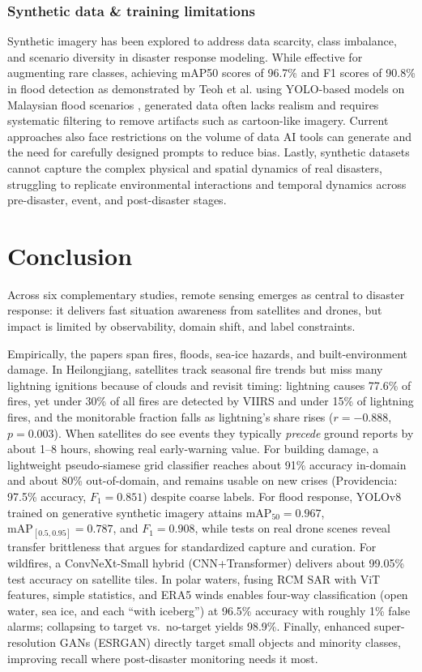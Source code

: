 \documentclass[conference,a4paper]{IEEEtran}
\begin{document}
\subsubsection{\textbf{Synthetic data \& training limitations}}
Synthetic imagery has been explored to address data scarcity, class imbalance, and scenario diversity in disaster response modeling. While effective for augmenting rare classes, achieving mAP50 scores of 96.7\% and F1 scores of 90.8\% in flood detection as demonstrated by Teoh et al. using YOLO-based models on Malaysian flood scenarios \cite{teohExploringGenerativeAI2024}, generated data often lacks realism and requires systematic filtering to remove artifacts such as cartoon-like imagery. Current approaches also face restrictions on the volume of data AI tools can generate and the need for carefully designed prompts to reduce bias. Lastly, synthetic datasets cannot capture the complex physical and spatial dynamics of real disasters, struggling to replicate environmental interactions and temporal dynamics across pre-disaster, event, and post-disaster stages.

\section{Conclusion}
Across six complementary studies, remote sensing emerges as central to disaster response: it delivers fast situation awareness from satellites and drones, but impact is limited by observability, domain shift, and label constraints.

Empirically, the papers span fires, floods, sea-ice hazards, and built-environment damage. In Heilongjiang, satellites track seasonal fire trends but miss many lightning ignitions because of clouds and revisit timing: lightning causes 77.6\% of fires, yet under 30\% of all fires are detected by VIIRS and under 15\% of lightning fires, and the monitorable fraction falls as lightning’s share rises ($r=-0.888$, $p=0.003$). When satellites do see events they typically \emph{precede} ground reports by about 1--8 hours, showing real early-warning value. For building damage, a lightweight pseudo-siamese grid classifier reaches about 91\% accuracy in-domain and about 80\% out-of-domain, and remains usable on new crises (Providencia: 97.5\% accuracy, $F_1=0.851$) despite coarse labels. For flood response, YOLOv8 trained on generative synthetic imagery attains $\text{mAP}_{50}=0.967$, $\text{mAP}_{[0.5,0.95]}=0.787$, and $F_1=0.908$, while tests on real drone scenes reveal transfer brittleness that argues for standardized capture and curation. For wildfires, a ConvNeXt-Small hybrid (CNN+Transformer) delivers about 99.05\% test accuracy on satellite tiles. In polar waters, fusing RCM SAR with ViT features, simple statistics, and ERA5 winds enables four-way classification (open water, sea ice, and each “with iceberg”) at 96.5\% accuracy with roughly 1\% false alarms; collapsing to target vs.\ no-target yields 98.9\%. Finally, enhanced super-resolution GANs (ESRGAN) directly target small objects and minority classes, improving recall where post-disaster monitoring needs it most.
\end{document}
